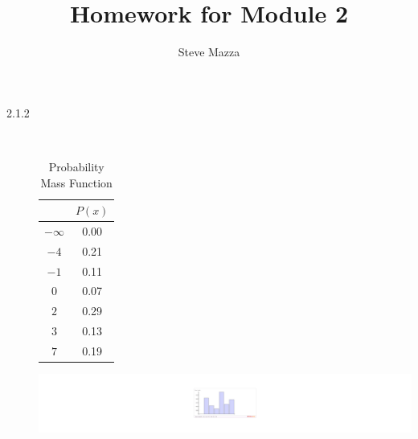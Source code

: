 \documentclass[letterpaper,10pt]{article}
\title{Homework for Module 2}
\author{Steve Mazza}
\begin{document}
\maketitle

\begin{description}
\item[2.1.2] \ 
\begin{table}[htdp]
\caption{Probability Mass Function}
\begin{center}
\begin{tabular}{|c|c|}
\hline
& \textbf{$P(x)$} \\ \hline
$- \infty$ & 0.00 \\ \hline
$-4$ & 0.21 \\ \hline
$-1$ & 0.11 \\ \hline
$0$ & 0.07 \\ \hline
$2$ & 0.29 \\ \hline
$3$ & 0.13 \\ \hline
$7$ & 0.19 \\
\hline
\end{tabular}
\end{center}
\label{default}
\end{table}

\begin{center}
\includegraphics[scale=0.75]{module2a.pdf}
\end{center}



\end{description}
\end{document}
